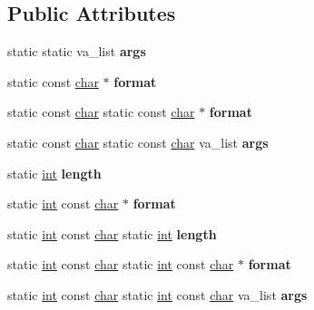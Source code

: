 \subsection*{Public Attributes}
\begin{DoxyCompactItemize}
\item 
\mbox{\label{classv8_1_1base_1_1OS_a1a63277c4801c90d2f13e1ff1d4dea64}} 
static static va\+\_\+list {\bfseries args}
\item 
\mbox{\label{classv8_1_1base_1_1OS_a2df245594e67255e3331276fb5bdb22d}} 
static const \mbox{\hyperlink{classchar}{char}} $\ast$ {\bfseries format}
\item 
\mbox{\label{classv8_1_1base_1_1OS_ad48be97874702511e157cb036a1e4828}} 
static const \mbox{\hyperlink{classchar}{char}} static const \mbox{\hyperlink{classchar}{char}} $\ast$ {\bfseries format}
\item 
\mbox{\label{classv8_1_1base_1_1OS_a4f52cade227a1654c2113aa33af7f92b}} 
static const \mbox{\hyperlink{classchar}{char}} static const \mbox{\hyperlink{classchar}{char}} va\+\_\+list {\bfseries args}
\item 
\mbox{\label{classv8_1_1base_1_1OS_adcf01466ae36305154d61c4b3e7ce924}} 
static \mbox{\hyperlink{classint}{int}} {\bfseries length}
\item 
\mbox{\label{classv8_1_1base_1_1OS_a2d3026206a49e6bb2cb4d09d57f86f33}} 
static \mbox{\hyperlink{classint}{int}} const \mbox{\hyperlink{classchar}{char}} $\ast$ {\bfseries format}
\item 
\mbox{\label{classv8_1_1base_1_1OS_a03a7915adb5028d39c7155f64e5a48be}} 
static \mbox{\hyperlink{classint}{int}} const \mbox{\hyperlink{classchar}{char}} static \mbox{\hyperlink{classint}{int}} {\bfseries length}
\item 
\mbox{\label{classv8_1_1base_1_1OS_affa1d7ab7b6beba461a75db9d789b72f}} 
static \mbox{\hyperlink{classint}{int}} const \mbox{\hyperlink{classchar}{char}} static \mbox{\hyperlink{classint}{int}} const \mbox{\hyperlink{classchar}{char}} $\ast$ {\bfseries format}
\item 
\mbox{\label{classv8_1_1base_1_1OS_aaee2d36cf44123a6191a520e702be6c7}} 
static \mbox{\hyperlink{classint}{int}} const \mbox{\hyperlink{classchar}{char}} static \mbox{\hyperlink{classint}{int}} const \mbox{\hyperlink{classchar}{char}} va\+\_\+list {\bfseries args}
\end{DoxyCompactItemize}
